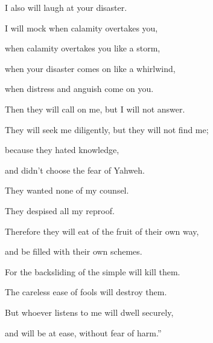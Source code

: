 {\par }{\Q {}I also will laugh at your disaster.
\par }{\QB I will mock when calamity overtakes you,
\par }{\Q {}when calamity overtakes you like a storm,
\par }{\QB when your disaster comes on like a whirlwind,
\par }{\QB when distress and anguish come on you.
\par }{\Q {}Then they will call on me, but I will not answer.
\par }{\QB They will seek me diligently, but they will not find me;
\par }{\Q {}because they hated knowledge,
\par }{\QB and didn’t choose the fear of Yahweh.
\par }{\Q {}They wanted none of my counsel.
\par }{\QB They despised all my reproof.
\par }{\Q {}Therefore they will eat of the fruit of their own way,
\par }{\QB and be filled with their own schemes.
\par }{\Q {}For the backsliding of the simple will kill them.
\par }{\QB The careless ease of fools will destroy them.
\par }{\Q {}But whoever listens to me will dwell securely,
\par }{\QB and will be at ease, without fear of harm.”

}

